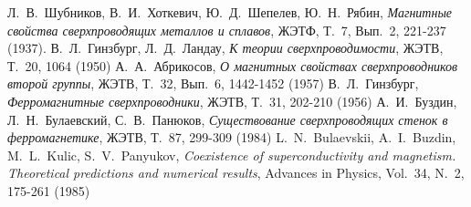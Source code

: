 \begin{thebibliography}{99}
     Л.~В.~Шубников, В.~И.~Хоткевич, Ю.~Д.~Шепелев, 
        Ю.~Н.~Рябин, \textit{Магнитные свойства сверхпроводящих металлов и 
        сплавов}, ЖЭТФ, Т.~7, Вып.~2, 221-237 (1937).
     В.~Л.~Гинзбург, Л.~Д.~Ландау, \textit{К теории 
        сверхпроводимости}, ЖЭТВ, Т.~20, 1064 (1950)
     А.~А.~Абрикосов, \textit{О магнитных свойствах 
        сверхпроводников второй группы}, ЖЭТВ, Т.~32, Вып.~6, 1442-1452 (1957)
     В.~Л.~Гинзбург, \textit{Ферромагнитные 
        сверхпроводники}, ЖЭТВ, Т.~31, 202-210 (1956)
     А.~И.~Буздин, Л.~Н.~Булаевский, С.~В.~Панюков, 
        \textit{Существование сверхпроводящих стенок в ферромагнетике}, 
        ЖЭТВ, Т.~87, 299-309 (1984)
     L.~N.~Bulaevskii, A.~I.~Buzdin, M.~L.~Kulic, 
        S.~V.~Panyukov, \textit{Coexistence of superconductivity and 
        magnetism. Theoretical predictions and numerical results}, Advances in 
        Physics, Vol.~34, N.~2, 175-261 (1985)
\end{thebibliography}